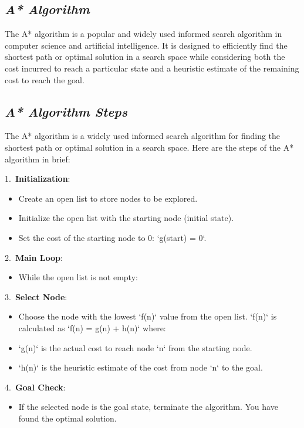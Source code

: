 \documentclass{article}
\begin{document}
\subsection{\textit{A* Algorithm}}
The A* algorithm is a popular and widely used informed search algorithm in computer science and artificial intelligence. It is designed to efficiently find the shortest path or optimal solution in a search space while considering both the cost incurred to reach a particular state and a heuristic estimate of the remaining cost to reach the goal.
\subsection{\textit{A* Algorithm Steps}}
The A* algorithm is a widely used informed search algorithm for finding the shortest path or optimal solution in a search space. Here are the steps of the A* algorithm in brief:

1.\ \textbf{Initialization}:
\begin{itemize}
    \item Create an open list to store nodes to be explored.
    \item Initialize the open list with the starting node (initial state).
    \item Set the cost of the starting node to 0: `g(start) = 0`.
\end{itemize}

2.\ \textbf{Main Loop}:
\begin{itemize}
    \item While the open list is not empty:
\end{itemize}
   
3.\ \textbf{Select Node}:
\begin{itemize}
    \item Choose the node with the lowest `f(n)` value from the open list. `f(n)` is calculated as `f(n) = g(n) + h(n)` where:
    \item `g(n)` is the actual cost to reach node `n` from the starting node.
    \item `h(n)` is the heuristic estimate of the cost from node `n` to the goal.
\end{itemize}

4.\ \textbf{Goal Check}:
\begin{itemize}
    \item If the selected node is the goal state, terminate the algorithm. You have found the optimal solution.
\end{itemize}
\end{document}
